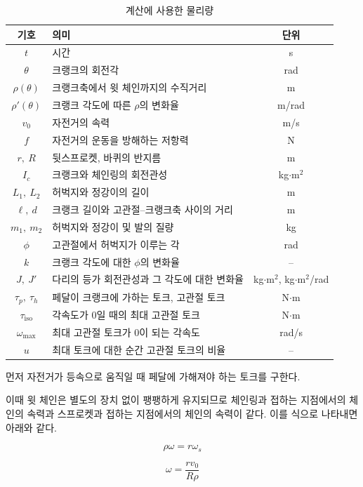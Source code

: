 \begin{table}[!htb]
\centering
\small
\begin{tabular}{@{}clc@{}}
\toprule
기호 & 의미 & 단위\\
\midrule
\(t\) & 시간 & s\\
\(\theta\) & 크랭크의 회전각 & rad\\
\(\rho(\theta)\) & 크랭크축에서 윗 체인까지의 수직거리 & m\\
\(\rho'(\theta)\) & 크랭크 각도에 따른 \(\rho\)의 변화율 & m/rad\\
\(v_0\) & 자전거의 속력 & m/s\\
\(f\) & 자전거의 운동을 방해하는 저항력 & N\\
\(r,\ R\) & 뒷스프로켓, 바퀴의 반지름 & m\\
\(I_c\) & 크랭크와 체인링의 회전관성 & kg\(\cdot\)m\(^2\)\\
\(L_1,\ L_2\) & 허벅지와 정강이의 길이 & m\\
\(\ell,\ d\) & 크랭크 길이와 고관절--크랭크축 사이의 거리 & m\\
\(m_1,\ m_2\) & 허벅지와 정강이 및 발의 질량 & kg\\
\(\phi\) & 고관절에서 허벅지가 이루는 각 & rad\\
\(k\) & 크랭크 각도에 대한 \(\phi\)의 변화율 & --\\
\(J,\ J'\) & 다리의 등가 회전관성과 그 각도에 대한 변화율 & kg\(\cdot\)m\(^2\), kg\(\cdot\)m\(^2\)/rad\\
\(\tau_p,\ \tau_h\) & 페달이 크랭크에 가하는 토크, 고관절 토크 & N\(\cdot\)m\\
\(\tau_{\mathrm{iso}}\) & 각속도가 0일 때의 최대 고관절 토크 & N\(\cdot\)m\\
\(\omega_{\max}\) & 최대 고관절 토크가 0이 되는 각속도 & rad/s\\
\(u\) & 최대 토크에 대한 순간 고관절 토크의 비율 & --\\
\bottomrule
\end{tabular}
\caption{계산에 사용한 물리량}
\label{tab:physical-quantities}
\end{table}

먼저 자전거가 등속으로 움직일 때 페달에 가해져야 하는 토크를 구한다.

이때 윗 체인은 별도의 장치 없이 팽팽하게 유지되므로 체인링과 접하는 지점에서의 체인의 속력과 스프로켓과 접하는 지점에서의 체인의 속력이 같다. 이를 식으로 나타내면 아래와 같다.

\[\rho \omega = r\omega_s\]


\[\omega = \dfrac{rv_0}{R\rho}\]



